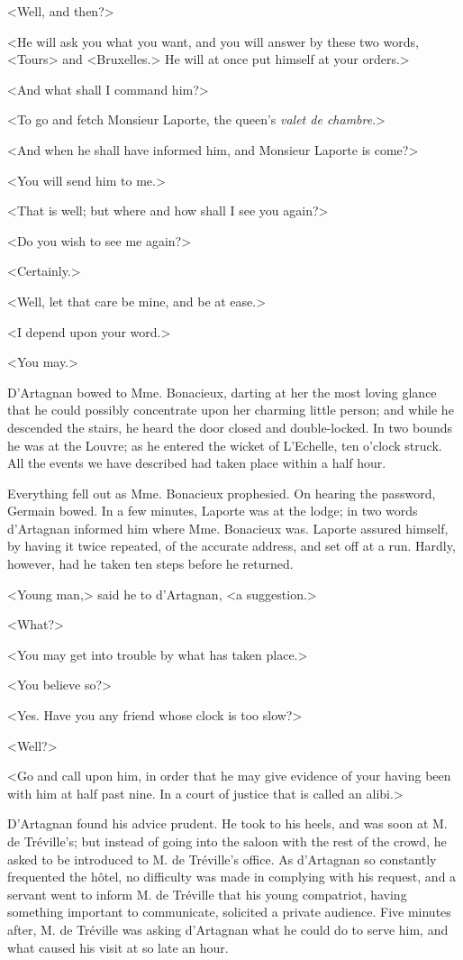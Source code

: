 <Well, and then?> 

<He will ask you what you want, and you will answer by these two words, <Tours> and <Bruxelles.> He will at once put himself at your orders.> 

<And what shall I command him?> 

<To go and fetch Monsieur Laporte, the queen's \textit{valet de chambre}.> 

<And when he shall have informed him, and Monsieur Laporte is come?> 

<You will send him to me.> 

<That is well; but where and how shall I see you again?> 

<Do you wish to see me again?> 

<Certainly.> 

<Well, let that care be mine, and be at ease.> 

<I depend upon your word.> 

<You may.> 

D'Artagnan bowed to Mme. Bonacieux, darting at her the most loving glance that he could possibly concentrate upon her charming little person; and while he descended the stairs, he heard the door closed and double-locked. In two bounds he was at the Louvre; as he entered the wicket of L'Echelle, ten o'clock struck. All the events we have described had taken place within a half hour. 

Everything fell out as Mme. Bonacieux prophesied. On hearing the password, Germain bowed. In a few minutes, Laporte was at the lodge; in two words d'Artagnan informed him where Mme. Bonacieux was. Laporte assured himself, by having it twice repeated, of the accurate address, and set off at a run. Hardly, however, had he taken ten steps before he returned. 

<Young man,> said he to d'Artagnan, <a suggestion.> 

<What?> 

<You may get into trouble by what has taken place.> 

<You believe so?> 

<Yes. Have you any friend whose clock is too slow?> 

<Well?> 

<Go and call upon him, in order that he may give evidence of your having been with him at half past nine. In a court of justice that is called an alibi.> 

D'Artagnan found his advice prudent. He took to his heels, and was soon at M. de Tréville's; but instead of going into the saloon with the rest of the crowd, he asked to be introduced to M. de Tréville's office. As d'Artagnan so constantly frequented the hôtel, no difficulty was made in complying with his request, and a servant went to inform M. de Tréville that his young compatriot, having something important to communicate, solicited a private audience. Five minutes after, M. de Tréville was asking d'Artagnan what he could do to serve him, and what caused his visit at so late an hour. 

